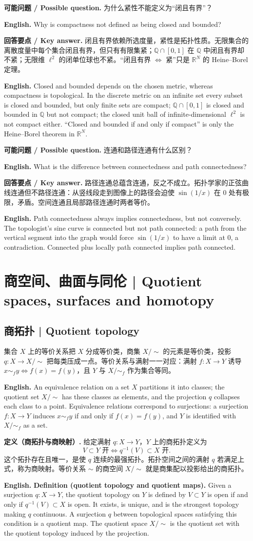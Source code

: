 \documentclass[UTF8,11pt,a4paper]{ctexart}
\newcommand{\EN}[1]{\par\noindent\textbf{English.} #1\par}
\newcommand{\ASK}[4]{\par\noindent\textbf{可能问题 / Possible question.} #1\par\EN{#2}\noindent\textbf{回答要点 / Key answer.} #3\par\EN{#4}\medskip}
\begin{document}
\ASK{为什么紧性不能定义为“闭且有界”？}{Why is compactness not defined as being closed and bounded?}{闭且有界依赖所选度量，紧性是拓扑性质。无限集合的离散度量中每个集合闭且有界，但只有有限集紧；$\mathbb Q\cap[0,1]$ 在 $\mathbb Q$ 中闭且有界却不紧；无限维 $\ell^2$ 的闭单位球也不紧。“闭且有界 $\Leftrightarrow$ 紧”只是 $\mathbb R^N$ 的 Heine--Borel 定理。}{Closed and bounded depends on the chosen metric, whereas compactness is topological. In the discrete metric on an infinite set every subset is closed and bounded, but only finite sets are compact; $\mathbb Q\cap[0,1]$ is closed and bounded in $\mathbb Q$ but not compact; the closed unit ball of infinite-dimensional $\ell^2$ is not compact either. ``Closed and bounded if and only if compact'' is only the Heine--Borel theorem in $\mathbb R^N$.}

\ASK{连通和路径连通有什么区别？}{What is the difference between connectedness and path connectedness?}{路径连通总蕴含连通，反之不成立。拓扑学家的正弦曲线连通但不路径连通：从竖线段走到图像上的路径会迫使 $\sin(1/x)$ 在 $0$ 处有极限，矛盾。空间连通且局部路径连通时两者等价。}{Path connectedness always implies connectedness, but not conversely. The topologist's sine curve is connected but not path connected: a path from the vertical segment into the graph would force $\sin(1/x)$ to have a limit at $0$, a contradiction. Connected plus locally path connected implies path connected.}

\section{商空间、曲面与同伦 | Quotient spaces, surfaces and homotopy}

\subsection{商拓扑 | Quotient topology}
\noindent 集合 $X$ 上的等价关系把 $X$ 分成等价类，商集 $X/{\sim}$ 的元素是等价类，投影 $q:X\to X/{\sim}$ 把每类压成一点。等价关系与满射一一对应：满射 $f:X\to Y$ 诱导 $x\sim_f y\iff f(x)=f(y)$，且 $Y$ 与 $X/{\sim_f}$ 作为集合等同。
\EN{An equivalence relation on a set $X$ partitions it into classes; the quotient set $X/{\sim}$ has these classes as elements, and the projection $q$ collapses each class to a point. Equivalence relations correspond to surjections: a surjection $f:X\to Y$ induces $x\sim_f y$ if and only if $f(x)=f(y)$, and $Y$ is identified with $X/{\sim_f}$ as a set.}

\noindent\textbf{定义（商拓扑与商映射）.} 给定满射 $q:X\to Y$，$Y$ 上的商拓扑定义为
\[
V\subset Y\text{ 开}\iff q^{-1}(V)\subset X\text{ 开}.
\]
这个拓扑存在且唯一，是使 $q$ 连续的最强拓扑。拓扑空间之间的满射 $q$ 若满足上式，称为商映射。等价关系 $\sim$ 的商空间 $X/{\sim}$ 就是商集配以投影给出的商拓扑。
\EN{\textbf{Definition (quotient topology and quotient maps).} Given a surjection $q:X\to Y$, the quotient topology on $Y$ is defined by $V\subset Y$ is open if and only if $q^{-1}(V)\subset X$ is open. It exists, is unique, and is the strongest topology making $q$ continuous. A surjection $q$ between topological spaces satisfying this condition is a quotient map. The quotient space $X/{\sim}$ is the quotient set with the quotient topology induced by the projection.}
\end{document}
